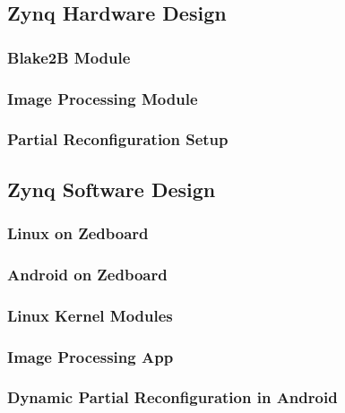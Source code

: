 \subsection{Zynq Hardware Design}\label{ssec:zynqhardwaredesign}

\subsubsection{Blake2B Module}\label{sssec:blake2bmodule}

\subsubsection{Image Processing Module}\label{sssec:imageprocessingmodule}

\subsubsection{Partial Reconfiguration Setup}\label{sssec:partialreconfigurationsetup}

\subsection{Zynq Software Design}\label{ssec:zynqsoftwaredesign}

\subsubsection{Linux on Zedboard}\label{sssec:linuxonzedboard}

\subsubsection{Android on Zedboard}\label{sssec:androidonzedboard}

\subsubsection{Linux Kernel Modules}\label{sssec:linuxkernelmodules}

\subsubsection{Image Processing App}\label{sssec:imageprocessingapp}

\subsubsection{Dynamic Partial Reconfiguration in Android}\label{sssec:dynamicpartialreconfiguration}

